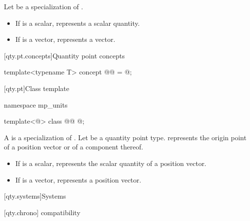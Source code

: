 \pnum
Let  be a specialization of .
\begin{itemize}
\item
If  is a scalar,
 represents a scalar quantity.
\item
If  is a vector,
 represents a vector.
\end{itemize}

[qty.pt.concepts]{Quantity point concepts}

\begin{itemdecl}
template<typename T>
concept @@ = @\unspecnc@;
\end{itemdecl}

[qty.pt]{Class template }

\begin{codeblock}
namespace mp_units {

template<@\unspec@>
class @@ { @\unspec@ };

}
\end{codeblock}

\pnum
\label{term.quantity.point.type}
A  is a specialization of .
Let  be a quantity point type.
 represents
the origin point of a position vector
or of a component thereof.
\begin{itemize}
\item
If  is a scalar,
 represents the scalar quantity
of a position vector.
\item
If  is a vector,
 represents a position vector.
\end{itemize}

[qty.systems]{Systems}

[qty.chrono]{ compatibility}

